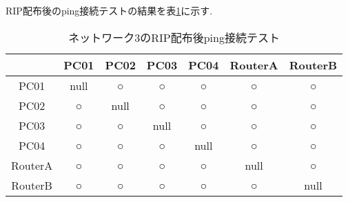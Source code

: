 \documentclass{jsarticle}
\begin{document}
RIP配布後のping接続テストの結果を表\ref{tab:ping3_rip}に示す. 

\begin{table}[htb]
  \begin{center}
    \caption{ネットワーク3のRIP配布後ping接続テスト}
    \begin{tabular}{|c|c|c|c|c|c|c|} \hline
       & PC01 & PC02 & PC03 & PC04 & RouterA & RouterB  \\ \hline 
PC01 & null & ○ & ○ & ○ & ○ & ○  \\  \hline
PC02 & ○ & null & ○ & ○ & ○ & ○  \\  \hline
PC03 & ○ & ○ & null & ○ & ○ & ○  \\  \hline
PC04 & ○ & ○ & ○ & null & ○ & ○  \\  \hline
RouterA & ○ & ○ & ○ & ○ & null & ○  \\  \hline
RouterB & ○ & ○ & ○ & ○ & ○ & null  \\  \hline
    \end{tabular}
	\label{tab:ping3_rip}
  \end{center}
\end{table}
\end{document}
